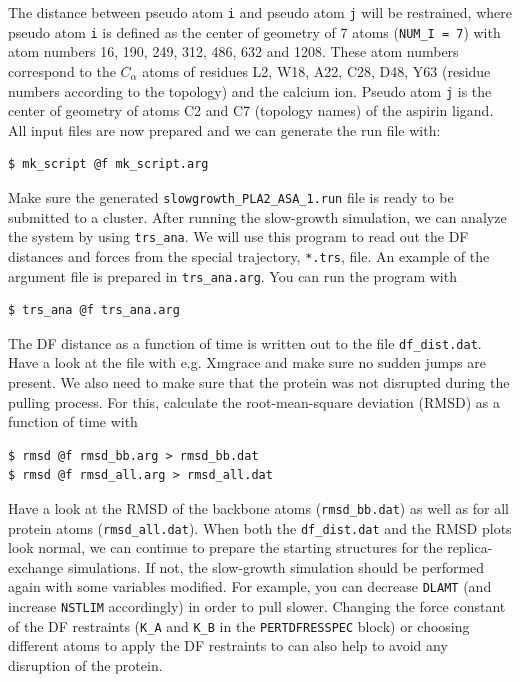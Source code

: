 The distance between pseudo atom \texttt{i} and pseudo atom \texttt{j} will be restrained, where pseudo atom \texttt{i} is defined as the center of geometry of 7 atoms (\texttt{NUM\_I = 7}) with atom numbers 16, 190, 249, 312, 486, 632 and 1208. 
These atom numbers correspond to the $C_{\alpha}$ atoms of residues L2, W18, A22, C28, D48, Y63 (residue numbers according to the topology) and the calcium ion. 
Pseudo atom \texttt{j} is the center of geometry of atoms C2 and C7 (topology names) of the aspirin ligand. 
All input files are now prepared and we can generate the run file with:
\begin{lstlisting}
$ mk_script @f mk_script.arg
\end{lstlisting}
Make sure the generated \texttt{slowgrowth\_PLA2\_ASA\_1.run} file is ready to be submitted to a cluster. 
After running the slow-growth simulation, we can analyze the system by using \texttt{trs\_ana}. 
We will use this program to read out the DF distances and forces from the special trajectory, \texttt{*.trs}, file. An example of the argument file is prepared in \texttt{trs\_ana.arg}. 
You can run the program with 
\begin{lstlisting}
$ trs_ana @f trs_ana.arg
\end{lstlisting}
The DF distance as a function of time is written out to the file \texttt{df\_dist.dat}. Have a look at the file with e.g. Xmgrace and make sure no sudden jumps are present. 
We also need to make sure that the protein was not disrupted during the pulling process. For this, calculate the root-mean-square deviation (RMSD) as a function of time with
\begin{lstlisting}
$ rmsd @f rmsd_bb.arg > rmsd_bb.dat
$ rmsd @f rmsd_all.arg > rmsd_all.dat
\end{lstlisting}
Have a look at the RMSD of the backbone atoms (\texttt{rmsd\_bb.dat}) as well as for all protein atoms (\texttt{rmsd\_all.dat}). 
When both the \texttt{df\_dist.dat} and the RMSD plots look normal, we can continue to prepare the starting structures for the replica-exchange simulations. 
If not, the slow-growth simulation should be performed again with some variables modified.
For example, you can decrease \texttt{DLAMT} (and increase \texttt{NSTLIM} accordingly) in order to pull slower. 
Changing the force constant of the DF restraints (\texttt{K\_A} and \texttt{K\_B} in the \texttt{PERTDFRESSPEC} block) or choosing different atoms to apply the DF restraints to can also help to avoid any disruption of the protein.

